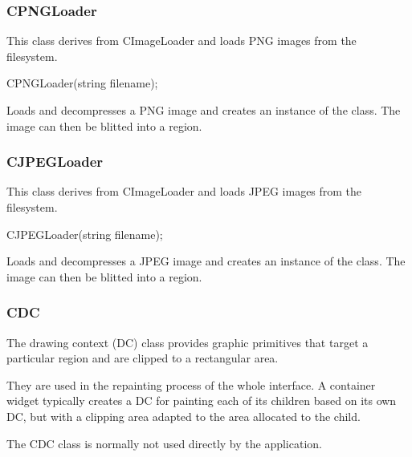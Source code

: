 \documentclass[a4paper,11pt]{journal}
\begin{document}
\subsubsection{CPNGLoader}
This class derives from CImageLoader and loads PNG images from the filesystem.
\begin{verbatimtab}CPNGLoader(string filename);\end{verbatimtab}
Loads and decompresses a PNG image and creates an instance of the class. The image can then be blitted into a region.

\subsubsection{CJPEGLoader}
This class derives from CImageLoader and loads JPEG images from the filesystem.
\begin{verbatimtab}CJPEGLoader(string filename);\end{verbatimtab}
Loads and decompresses a JPEG image and creates an instance of the class. The image can then be blitted into a region.

\subsubsection{CDC}
The drawing context (DC) class provides graphic primitives that target a particular region and are clipped to a rectangular area.

They are used in the repainting process of the whole interface. A container widget typically creates a DC for painting each of its children based on its own DC, but with a clipping area adapted to the area allocated to the child.

The CDC class is normally not used directly by the application.
\end{document}
